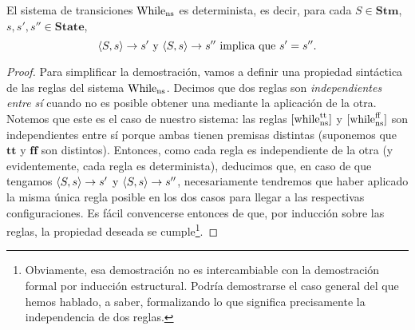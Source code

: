\begin{theorem}\label{determinismo}
El sistema de transiciones $\mathrm{While}_{\mathrm{ns}}$ es determinista, es decir, para cada $S \in \mathbf{Stm}$, $s, s', s'' \in \mathbf{State}$,  
$$\langle S, s \rangle\rightarrow s' \text{ y } \langle S, s \rangle\rightarrow s'' \text{ implica que } s'= s''.$$
\end{theorem}
\begin{proof}
Para simplificar la demostración, vamos a definir una propiedad sintáctica de las reglas del sistema $\mathrm{While}_{\mathrm{ns}}$. Decimos que dos reglas son \textit{independientes entre sí} cuando no es posible obtener una mediante la aplicación de la otra. Notemos que este es el caso de nuestro sistema: las reglas $[\mathrm{while}_{\mathrm{ns}}^{\mathrm{tt}}]$ y $[\mathrm{while}_{\mathrm{ns}}^{\mathrm{ff}}]$ son independientes entre sí porque ambas tienen premisas distintas (suponemos que $\mathbf{tt}$ y $\mathbf{ff}$ son distintos). Entonces, como cada regla es independiente de la otra (y evidentemente, cada regla es determinista), deducimos que, en caso de que tengamos $\langle S, s \rangle\rightarrow s'$ y $\langle S, s \rangle\rightarrow s''$, necesariamente tendremos que haber aplicado la misma única regla posible en los dos casos para llegar a las respectivas configuraciones. Es fácil convencerse entonces de que, por inducción sobre las reglas, la propiedad deseada se cumple\footnote{Obviamente, esa demostración no es intercambiable con la demostración formal por inducción estructural. Podría demostrarse el caso general del que hemos hablado, a saber, formalizando lo que significa precisamente la independencia de dos reglas.}. 
\end{proof}
